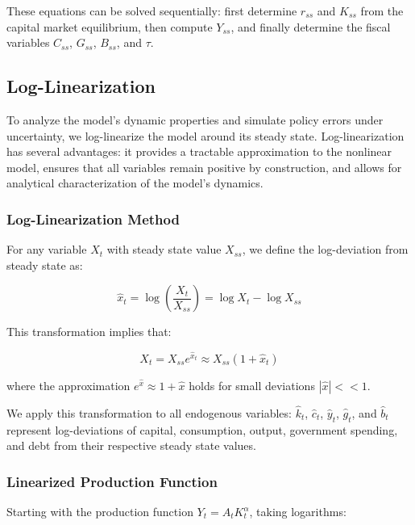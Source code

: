 \documentclass[5p,authoryear]{elsarticle}
\begin{document}
These equations can be solved sequentially: first determine $r_{ss}$ and $K_{ss}$ from the capital market equilibrium, then compute $Y_{ss}$, and finally determine the fiscal variables $C_{ss}$, $G_{ss}$, $B_{ss}$, and $\tau$.

\subsection{Log-Linearization}

To analyze the model's dynamic properties and simulate policy errors under uncertainty, we log-linearize the model around its steady state. Log-linearization has several advantages: it provides a tractable approximation to the nonlinear model, ensures that all variables remain positive by construction, and allows for analytical characterization of the model's dynamics.

\subsubsection{Log-Linearization Method}

For any variable $X_t$ with steady state value $X_{ss}$, we define the log-deviation from steady state as:

\begin{equation}
\hat{x}_t = \log \left( \frac{X_t}{X_{ss}} \right) = \log X_t - \log X_{ss}
\label{eq:log_deviation}
\end{equation}

This transformation implies that:

\begin{equation}
X_t = X_{ss} e^{\hat{x}_t} \approx X_{ss} (1 + \hat{x}_t)
\label{eq:level_approximation}
\end{equation}

where the approximation $e^{\hat{x}} \approx 1 + \hat{x}$ holds for small deviations $|\hat{x}| << 1$.

We apply this transformation to all endogenous variables: $\hat{k}_t$, $\hat{c}_t$, $\hat{y}_t$, $\hat{g}_t$, and $\hat{b}_t$ represent log-deviations of capital, consumption, output, government spending, and debt from their respective steady state values.

\subsubsection{Linearized Production Function}

Starting with the production function $Y_t = A_t K_t^{\alpha}$, taking logarithms:
\end{document}
